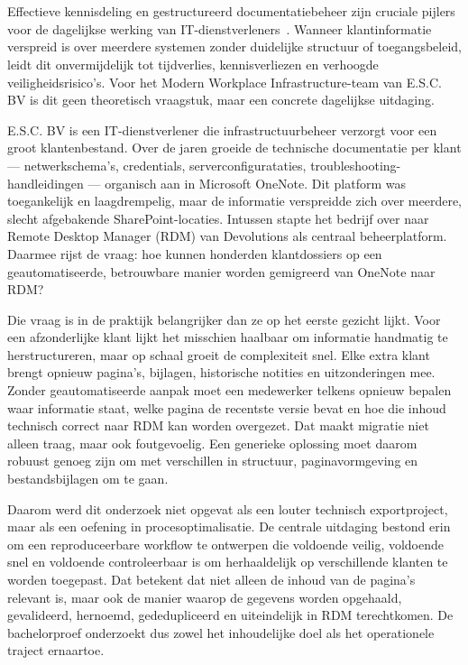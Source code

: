 
\chapter{}%
\label{ch:inleiding}

Effectieve kennisdeling en gestructureerd documentatiebeheer zijn cruciale pijlers voor de dagelijkse werking van IT-dienstverleners~\autocite{Abbas2022}. Wanneer klantinformatie verspreid is over meerdere systemen zonder duidelijke structuur of toegangsbeleid, leidt dit onvermijdelijk tot tijdverlies, kennisverliezen en verhoogde veiligheidsrisico's. Voor het Modern Workplace Infrastructure-team van E.S.C. BV is dit geen theoretisch vraagstuk, maar een concrete dagelijkse uitdaging.

E.S.C. BV is een IT-dienstverlener die infrastructuurbeheer verzorgt voor een groot klantenbestand. Over de jaren groeide de technische documentatie per klant --- netwerkschema's, credentials, serverconfigurataties, troubleshooting-handleidingen --- organisch aan in Microsoft OneNote. Dit platform was toegankelijk en laagdrempelig, maar de informatie verspreidde zich over meerdere, slecht afgebakende SharePoint-locaties. Intussen stapte het bedrijf over naar Remote Desktop Manager (RDM) van Devolutions als centraal beheerplatform. Daarmee rijst de vraag: hoe kunnen honderden klantdossiers op een geautomatiseerde, betrouwbare manier worden gemigreerd van OneNote naar RDM?

Die vraag is in de praktijk belangrijker dan ze op het eerste gezicht lijkt. Voor een afzonderlijke klant lijkt het misschien haalbaar om informatie handmatig te herstructureren, maar op schaal groeit de complexiteit snel. Elke extra klant brengt opnieuw pagina's, bijlagen, historische notities en uitzonderingen mee. Zonder geautomatiseerde aanpak moet een medewerker telkens opnieuw bepalen waar informatie staat, welke pagina de recentste versie bevat en hoe die inhoud technisch correct naar RDM kan worden overgezet. Dat maakt migratie niet alleen traag, maar ook foutgevoelig. Een generieke oplossing moet daarom robuust genoeg zijn om met verschillen in structuur, paginavormgeving en bestandsbijlagen om te gaan.

Daarom werd dit onderzoek niet opgevat als een louter technisch exportproject, maar als een oefening in procesoptimalisatie. De centrale uitdaging bestond erin om een reproduceerbare workflow te ontwerpen die voldoende veilig, voldoende snel en voldoende controleerbaar is om herhaaldelijk op verschillende klanten te worden toegepast. Dat betekent dat niet alleen de inhoud van de pagina's relevant is, maar ook de manier waarop de gegevens worden opgehaald, gevalideerd, hernoemd, gededupliceerd en uiteindelijk in RDM terechtkomen. De bachelorproef onderzoekt dus zowel het inhoudelijke doel als het operationele traject ernaartoe.

